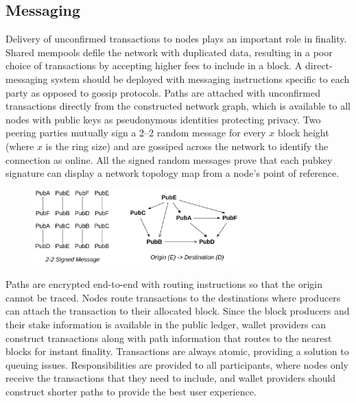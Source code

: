 \documentclass[a4paper, 10pt]{extarticle}
\begin{document}
\subsection{Messaging}
Delivery of unconfirmed transactions to nodes plays an important role in finality. Shared mempools defile the network with duplicated data, resulting in a poor choice of transactions by accepting higher fees to include in a block. A direct-messaging system should be deployed with messaging instructions specific to each party as opposed to gossip protocols. Paths are attached with unconfirmed transactions directly from the constructed network graph, which is available to all nodes with public keys as pseudonymous identities protecting privacy. Two peering parties mutually sign a 2–2 random message for every $x$ block height (where $x$ is the ring size) and are gossiped across the network to identify the connection as online. All the signed random messages prove that each pubkey signature can display a network topology map from a node's point of reference.
\begin{figure}[H]
\begin{center}
\includegraphics[width=8cm]{topology}
\end{center}
\end{figure}
Paths are encrypted end-to-end with routing \cite{poon2016bitcoin} instructions so that the origin cannot be traced. Nodes route transactions to the destinations where producers can attach the transaction to their allocated block. Since the block producers and their stake information is available in the public ledger, wallet providers can construct transactions along with path information that routes to the nearest blocks for instant finality. Transactions are always atomic, providing a solution to queuing issues. Responsibilities are provided to all participants, where nodes only receive the transactions that they need to include, and wallet providers should construct shorter paths to provide the best user experience.
\end{document}
